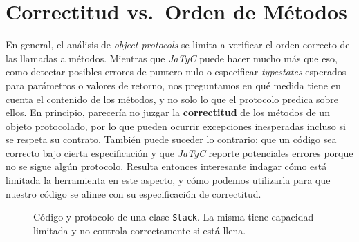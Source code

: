 %     
%     



\section{Correctitud vs.\ Orden de Métodos}

En general, el análisis de \textit{object protocols} se limita a verificar el orden correcto de las llamadas a métodos. Mientras que \textit{JaTyC} puede hacer mucho más que eso, como detectar posibles errores de puntero nulo o especificar \textit{typestates} esperados para parámetros o valores de retorno, nos preguntamos en qué medida tiene en cuenta el contenido de los métodos, y no solo lo que el protocolo predica sobre ellos. En principio, parecería no juzgar la \textbf{correctitud} de los métodos de un objeto protocolado, por lo que pueden ocurrir excepciones inesperadas incluso si se respeta su contrato. También puede suceder lo contrario: que un código sea correcto bajo cierta especificación y que \textit{JaTyC} reporte potenciales errores porque no se sigue algún protocolo. Resulta entonces interesante indagar cómo está limitada la herramienta en este aspecto, y cómo podemos utilizarla para que nuestro código se alinee con su especificación de correctitud.

\begin{figure}[htbp]
\centering
\begin{minipage}[t]{0.48\textwidth}
        
\end{minipage}
\hfill
\begin{minipage}[t]{0.48\textwidth}
    
\end{minipage}
\caption{Código y protocolo de una clase \texttt{Stack}. La misma tiene capacidad limitada y no controla correctamente si está llena.}
\label{exp:faulty-stack:stack}
\end{figure}

